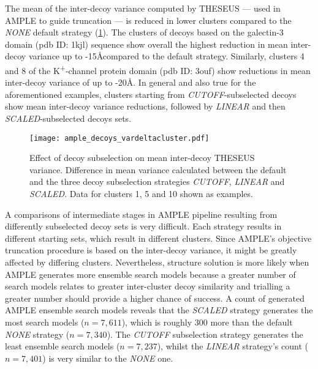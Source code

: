 The mean of the inter-decoy variance computed by THESEUS --- used in AMPLE to guide truncation --- is reduced in lower clusters compared to the \textit{NONE} default strategy (\cref{fig:ample_decoys_vardeltacluster}). The clusters of decoys based on the galectin-3 domain (\gls{pdb} ID: 1kjl) sequence show overall the highest reduction in mean inter-decoy variance up to -15\AA compared to the default strategy. Similarly, clusters 4 and 8 of the K\textsuperscript{+}-channel protein domain (\gls{pdb} ID: 3ouf) show reductions in mean inter-decoy variance of up to -20\AA. In general and also true for the aforementioned examples, clusters starting from \textit{CUTOFF}-subselected decoys show mean inter-decoy variance reductions, followed by \textit{LINEAR} and then \textit{SCALED}-subselected decoys sets.

\begin{figure}[H]
    \centering
    \texttt{[image: ample\_decoys\_vardeltacluster.pdf]}
    \caption[Effect of decoy subselection on THESEUS variance]{Effect of decoy subselection on mean inter-decoy THESEUS variance. Difference in mean variance calculated between the default and the three decoy subselection strategies \textit{CUTOFF}, \textit{LINEAR} and \textit{SCALED}. Data for clusters 1, 5 and 10 shown as examples.}
    \label{fig:ample_decoys_vardeltacluster}
\end{figure}

A comparisons of intermediate stages in AMPLE pipeline resulting from differently subselected decoy sets is very difficult. Each strategy results in different starting sets, which result in different clusters. Since AMPLE's objective truncation procedure is based on the inter-decoy variance, it might be greatly affected by differing clusters. Nevertheless, structure solution is more likely when AMPLE generates more ensemble search models because a greater number of search models relates to greater inter-cluster decoy similarity and trialling a greater number should provide a higher chance of success. A count of generated AMPLE ensemble search models reveals that the \textit{SCALED} strategy generates the most search models ($n=7,611$), which is roughly 300 more than the default \textit{NONE} strategy ($n=7,340$). The \textit{CUTOFF} subselection strategy generates the least ensemble search models ($n=7,237$), whilst the \textit{LINEAR} strategy's count ($n=7,401$) is very similar to the \textit{NONE} one.

